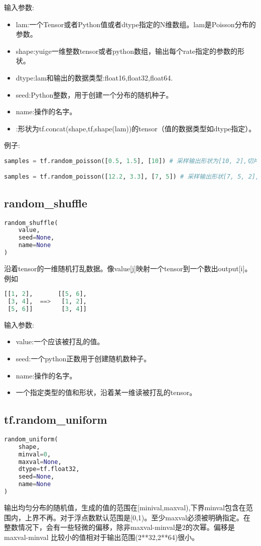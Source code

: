 输入参数:
\begin{itemize}
\item lam:一个Tensor或者Python值或者dtype指定的N维数组。lam是Poisson分布的参数。
\item shape:yuige一维整数tensor或者python数组，输出每个rate指定的参数的形状。
\item dtype:lam和输出的数据类型:float16,float32,float64.
\item seed:Python整数，用于创建一个分布的随机种子。
\item name:操作的名字。
\item[Returns]:形状为tf.concat(shape,tf,shape(lam))的tensor（值的数据类型如dtype指定）。
\end{itemize}
例子:
\begin{lstlisting}[language=Python]
samples = tf.random_poisson([0.5, 1.5], [10]) # 采样输出形状为[10, 2],切片输出 [:, 0] and [:, 1] 代表不同分布的数据

samples = tf.random_poisson([12.2, 3.3], [7, 5]) # 采样输出形状[7, 5, 2], chide切片[:, :, 0]和[:, :, 1]代表 $7\times5$从两个分布的采样输出。
\end{lstlisting}
\subsection{random\_shuffle}
\begin{lstlisting}[language=Python]
random_shuffle(
    value,
    seed=None,
    name=None
)
\end{lstlisting}
沿着tensor的一维随机打乱数据。像value[j]映射一个tensor到一个数出output[i]。例如
\begin{lstlisting}[language=Python]
[[1, 2],       [[5, 6],
 [3, 4],  ==>   [1, 2],
 [5, 6]]        [3, 4]]
\end{lstlisting}
输入参数:
\begin{itemize}
\item value:一个应该被打乱的值。
\item seed:一个python正数用于创建随机数种子。
\item name:操作的名字。
\item[Returns] 一个指定类型的值和形状，沿着某一维读被打乱的tensor。
\end{itemize}
\subsection{tf.random\_uniform}
\begin{lstlisting}[language=Python]
random_uniform(
    shape,
    minval=0,
    maxval=None,
    dtype=tf.float32,
    seed=None,
    name=None
)
\end{lstlisting}
输出均匀分布的随机值，生成的值的范围在[minival,maxval),下界minval包含在范围内，上界不再。对于浮点数默认范围是[0,1)。至少maxval必须被明确指定。在整数情况下，会有一些轻微的偏移，除非maxval-minval是2的次幂。偏移是maxval-minval
比较小的值相对于输出范围(2**32,2**64)很小。


